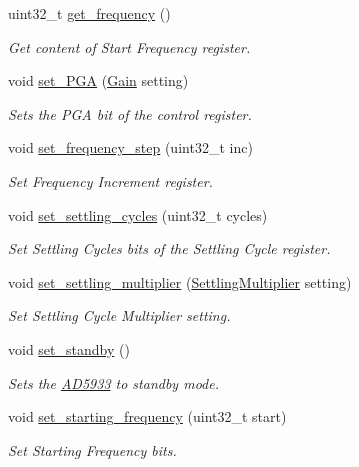 \begin{DoxyCompactItemize}
uint32\+\_\+t \mbox{\hyperlink{struct_a_d5933_aa9d0a7684997e6b7f662f1ad5acc2074}{get\+\_\+frequency}} ()
\begin{DoxyCompactList}\small\item\em Get content of Start Frequency register. \end{DoxyCompactList}\item 
void \mbox{\hyperlink{struct_a_d5933_a7b534f2c2b7eb612db9e2a9a89020e19}{set\+\_\+\+P\+GA}} (\mbox{\hyperlink{ad5933_8hpp_a8bc3a010269d8968cd5e6a0c119ed1e1}{Gain}} setting)
\begin{DoxyCompactList}\small\item\em Sets the P\+GA bit of the control register. \end{DoxyCompactList}\item 
void \mbox{\hyperlink{struct_a_d5933_ab55703415fd754ccef3f3ff188903a9e}{set\+\_\+frequency\+\_\+step}} (uint32\+\_\+t inc)
\begin{DoxyCompactList}\small\item\em Set Frequency Increment register. \end{DoxyCompactList}\item 
void \mbox{\hyperlink{struct_a_d5933_a210f3b7d58fdd3504d69d7ecba962662}{set\+\_\+settling\+\_\+cycles}} (uint32\+\_\+t cycles)
\begin{DoxyCompactList}\small\item\em Set Settling Cycles bits of the Settling Cycle register. \end{DoxyCompactList}\item 
void \mbox{\hyperlink{struct_a_d5933_adf0b76ea665a956f1002c55360666f3d}{set\+\_\+settling\+\_\+multiplier}} (\mbox{\hyperlink{ad5933_8hpp_a0556cc9a11c997a97ffc50ecb94e59b8}{Settling\+Multiplier}} setting)
\begin{DoxyCompactList}\small\item\em Set Settling Cycle Multiplier setting. \end{DoxyCompactList}\item 
void \mbox{\hyperlink{struct_a_d5933_afb48b21e141f060170ea4065bf33f1f5}{set\+\_\+standby}} ()
\begin{DoxyCompactList}\small\item\em Sets the \mbox{\hyperlink{struct_a_d5933}{A\+D5933}} to standby mode. \end{DoxyCompactList}\item 
void \mbox{\hyperlink{struct_a_d5933_ad90d16efcaf008887ff6cb995832671e}{set\+\_\+starting\+\_\+frequency}} (uint32\+\_\+t start)
\begin{DoxyCompactList}\small\item\em Set Starting Frequency bits. \end{DoxyCompactList}\item 

\end{DoxyCompactItemize}

